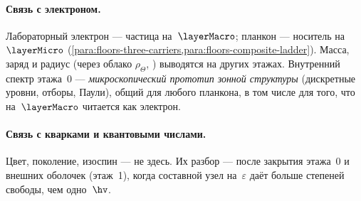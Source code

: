 \paragraph{Связь с электроном.}
Лабораторный электрон --- частица на~$\layerMacro$; планкон --- носитель на~$\layerMicro$
(\cref{para:floors-three-carriers,para:floors-composite-ladder}).
Масса, заряд и радиус (через облако $\rho_\Theta$, ) выводятся на других этажах.
Внутренний спектр этажа~0 --- \emph{микроскопический прототип зонной структуры}
(дискретные уровни, отборы, Паули), общий для любого планкона,
в том числе для того, что на~$\layerMacro$ читается как электрон.

\paragraph{Связь с кварками и квантовыми числами.}
Цвет, поколение, изоспин --- не здесь.
Их разбор --- после закрытия этажа~0 и внешних оболочек (этаж~1),
когда составной узел на~$\varepsilon$ даёт больше степеней свободы, чем одно~$\hv$.
